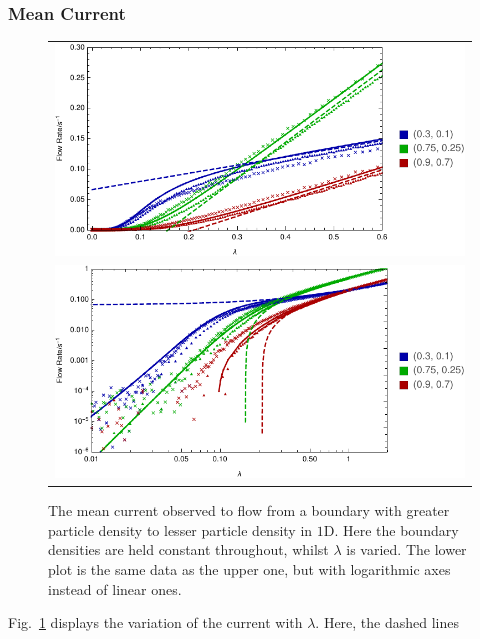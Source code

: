 \subsubsection{Mean Current}
\begin{figure} \caption[The current flowing through systems as we vary $\lambda$ with constant boundaries,
$1$D]{The mean current observed to flow from a boundary with greater particle density to lesser particle 
density in $1$D. Here the boundary densities are held constant throughout, whilst $\lambda$ is varied.
The lower plot is the same data as the upper one, but with logarithmic axes instead of linear ones.} 
\label{fig:1DlambdaScans}
\begin{center}
\begin{tabular}{c} 
\includegraphics[width=1.1\linewidth]{numerics/images/lambdaScan/allDataLinear} \\
\includegraphics[width=1.1\linewidth]{numerics/images/lambdaScan/allData} \\
\end{tabular}
\end{center}
\end{figure}
Fig.~\ref{fig:1DlambdaScans} displays the variation of the current with $\lambda$. Here, the dashed lines
